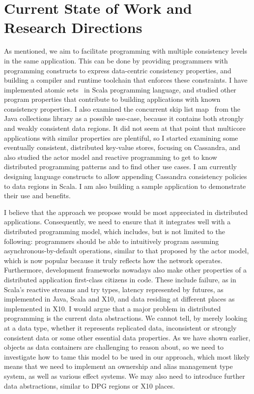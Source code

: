 \documentclass[]{usiinfprospectus}
\begin{document}
\section{Current State of Work and Research Directions}
As mentioned, we aim to facilitate programming with multiple consistency levels in the same application. This can be done by providing programmers with programming constructs to express data-centric consistency properties, and building a compiler and runtime toolchain that enforces these constraints. I have implemented atomic sets~\cite{dolby2012data} in Scala programming language, and studied other program properties that contribute to building applications with known consistency properties. I also examined the concurrent skip list map~\cite{concurrentskiplistmap} from the Java collections library as a possible use-case, because it contains both strongly and weakly consistent data regions. It did not seem at that point that multicore applications  with similar properties are plentiful, so I started examining some eventually consistent, distributed key-value stores, focusing on Cassandra, and also studied the actor model and reactive programming to get to know distributed programming patterns and to find other use cases. I am currently designing language constructs to allow appending Cassandra consistency policies to data regions in Scala. I am also building a sample application to demonstrate their use and benefits.

I believe that the approach we propose would be most appreciated in distributed applications. Consequently, we need to ensure that it integrates well with a distributed programming model, which includes, but is not limited to the following: programmers should be able to intuitively program assuming asynchronous-by-default operations, similar to that proposed by the actor model, which is now popular because it truly reflects how the network operates. Furthermore, development frameworks nowadays also make other properties of a distributed application first-class citizens in code. These include failure, as in Scala's reactive streams and try types, latency represented by futures, as implemented in Java, Scala and X10, and data residing at different places as implemented in X10. 
I would argue that a major problem in distributed programming is the current data abstractions. We cannot tell, by merely looking at a data type, whether it represents replicated data, inconsistent or strongly consistent data or some other essential data properties. As we have shown earlier, objects as data containers are challenging to reason about, so we need to investigate how to tame this model to be used in our approach, which most likely means that we need to implement an ownership and alias management type system, as well as various effect systems. We may also need to introduce further data abstractions, similar to DPG regions or X10 places. 
\end{document}
